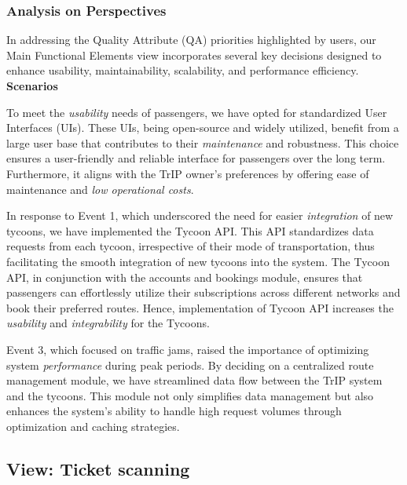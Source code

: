 \subsubsection{Analysis on Perspectives}
In addressing the Quality Attribute (QA) priorities highlighted by users, our Main Functional Elements view incorporates several key decisions designed to enhance usability, maintainability, scalability, and performance efficiency. \\

\noindent \textbf{Scenarios}
\scenarioOneFunctional
\scenarioTwoFunctional

\noindent To meet the \textit{usability} needs of passengers, we have opted for standardized User Interfaces (UIs). These UIs, being open-source and widely utilized, benefit from a large user base that contributes to their \textit{maintenance} and robustness. This choice ensures a user-friendly and reliable interface for passengers over the long term. Furthermore, it aligns with the TrIP owner's preferences by offering ease of maintenance and \textit{low operational costs}.

In response to Event 1, which underscored the need for easier \textit{integration} of new tycoons, we have implemented the Tycoon API. This API standardizes data requests from each tycoon, irrespective of their mode of transportation, thus facilitating the smooth integration of new tycoons into the system. The Tycoon API, in conjunction with the accounts and bookings module, ensures that passengers can effortlessly utilize their subscriptions across different networks and book their preferred routes. Hence, implementation of Tycoon API increases the \textit{usability} and \textit{integrability} for the Tycoons.

Event 3, which focused on traffic jams, raised the importance of optimizing system \textit{performance} during peak periods. By deciding on a centralized route management module, we have streamlined data flow between the TrIP system and the tycoons. This module not only simplifies data management but also enhances the system's ability to handle high request volumes through optimization and caching strategies.

\subsection{View: Ticket scanning}
